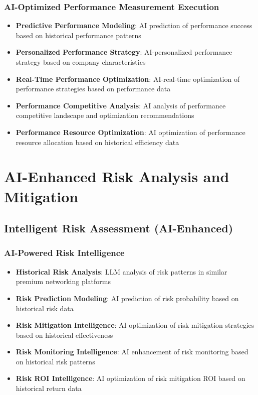 \subsubsection{AI-Optimized Performance Measurement Execution}

\begin{itemize}
    \item \textbf{Predictive Performance Modeling}: AI prediction of performance success based on historical performance patterns
    \item \textbf{Personalized Performance Strategy}: AI-personalized performance strategy based on company characteristics
    \item \textbf{Real-Time Performance Optimization}: AI-real-time optimization of performance strategies based on performance data
    \item \textbf{Performance Competitive Analysis}: AI analysis of performance competitive landscape and optimization recommendations
    \item \textbf{Performance Resource Optimization}: AI optimization of performance resource allocation based on historical efficiency data
\end{itemize}

\section{AI-Enhanced Risk Analysis and Mitigation}

\subsection{Intelligent Risk Assessment (AI-Enhanced)}

\subsubsection{AI-Powered Risk Intelligence}

\begin{itemize}
    \item \textbf{Historical Risk Analysis}: LLM analysis of risk patterns in similar premium networking platforms
    \item \textbf{Risk Prediction Modeling}: AI prediction of risk probability based on historical risk data
    \item \textbf{Risk Mitigation Intelligence}: AI optimization of risk mitigation strategies based on historical effectiveness
    \item \textbf{Risk Monitoring Intelligence}: AI enhancement of risk monitoring based on historical risk patterns
    \item \textbf{Risk ROI Intelligence}: AI optimization of risk mitigation ROI based on historical return data
\end{itemize}

